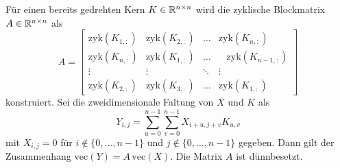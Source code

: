 \begin{lem}
    Für einen bereits gedrehten Kern $K \in \mathbb{R}^{n \times n}$ wird die zyklische Blockmatrix $A \in \mathbb{R}^{n \times n}$ als
    \begin{equation*}
        A=\begin{bmatrix}
            \mathrm{zyk}(K_{1,:}) &\mathrm{zyk}(K_{2,:}) &\ldots &\mathrm{zyk}(K_{n,:}) \\
            \mathrm{zyk}(K_{n,:}) &\mathrm{zyk}(K_{1,:}) &\ldots & \; \; \;\mathrm{zyk}(K_{n-1,:})\\
            \vdots &\vdots &\ddots &\vdots\\
            \mathrm{zyk}(K_{2,:}) &\mathrm{zyk}(K_{3,:}) &\ldots &\mathrm{zyk}(K_{1,:})
        \end{bmatrix}
    \end{equation*}
    konstruiert. Sei die zweidimensionale Faltung  von $X$ und $K$ als
    \begin{equation*}
        Y_{i,j}= \sum_{u=0}^{n-1} \sum _{v=0}^{n-1} X_{i+u,j+v} K_{u,v} 
    \end{equation*}
    mit $X_{i,j}=0$ für $i \notin\{0,\ldots, n-1\}$ und $j \notin \{0, \ldots, n-1\}$ gegeben. Dann gilt der Zusammenhang
    $\mathrm{vec}(Y)=A \, \mathrm{vec}(X)$. Die Matrix $A$ ist dünnbesetzt. 
\end{lem}

